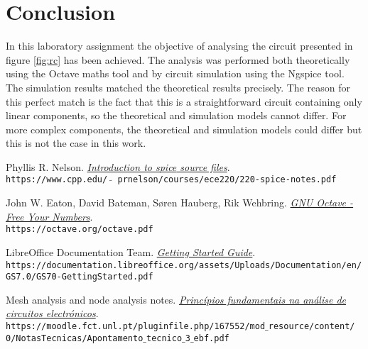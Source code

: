 \newpage
\section{Conclusion}
\label{sec:conclusion}

In this laboratory assignment the objective of analysing the circuit presented
in figure \ref{fig:rc} has been achieved. The analysis was performed both theoretically
using the Octave maths tool and by circuit simulation using the Ngspice tool.
The simulation results matched the theoretical results precisely.
The reason for this perfect match is the fact that this is a
straightforward circuit containing only linear components, so the theoretical
and simulation models cannot differ. For more complex components, the
theoretical and simulation models could differ but this is not the case in this
work.

\begin{thebibliography}{9}

    Phyllis R. Nelson.
    \textit{\href{https://www.cpp.edu/~prnelson/courses/ece220/220-spice-notes.pdf}{Introduction to \emph{spice} source files}}.
    \\\texttt{https://www.cpp.edu/ $\tilde{}$ prnelson/courses/ece220/220-spice-notes.pdf}


    John W. Eaton, David Bateman, Søren Hauberg, Rik Wehbring.
    \textit{\href{https://octave.org/octave.pdf}{GNU Octave - Free Your Numbers}}.
    \\\texttt{https://octave.org/octave.pdf}

    LibreOffice Documentation Team.
    \textit{\href{https://documentation.libreoffice.org/assets/Uploads/Documentation/en/GS7.0/GS70-GettingStarted.pdf}{Getting Started Guide}}.
    \\\texttt{https://documentation.libreoffice.org/assets/Uploads/Documentation/en/
        GS7.0/GS70-GettingStarted.pdf}

    Mesh analysis and node analysis notes.
    \textit{\href{https://moodle.fct.unl.pt/pluginfile.php/167552/mod_resource/content/0/NotasTecnicas/Apontamento_tecnico_3_ebf.pdf}{Princípios fundamentais na análise de circuitos electrónicos}}.
    \\\texttt{https://moodle.fct.unl.pt/pluginfile.php/167552/mod$\_$resource/content/
        0/NotasTecnicas/Apontamento$\_$tecnico$\_$3$\_$ebf.pdf}

\end{thebibliography}
